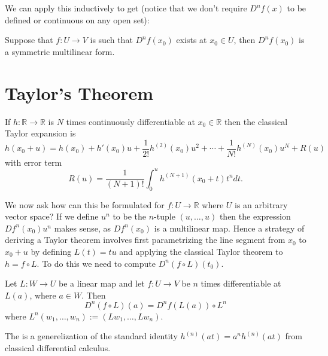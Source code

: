 \documentclass[twoside, a4paper, 10pt]{amsart}
\begin{document}
We can apply this inductively to get (notice that we don't require $D^nf(x)$ to be defined or continuous on any open set): 
\begin{thm} Suppose that $f:U \to V$ is such that $D^nf(x_0)$ exists at $x_0 \in U$, then $D^nf(x_0)$ is a symmetric multilinear form. \end{thm} 

\section{Taylor's Theorem}

If $h: \mathbb{R} \to \mathbb{R}$ is $N$ times continuously differentiable at $x_0 \in \mathbb{R}$ then the classical Taylor expansion is $$h(x_0 + u) = h(x_0) + h'(x_0)u + \frac{1}{2!}h^{(2)}(x_0)u^2 + \cdots + \frac{1}{N!}h^{(N)}(x_0)u^N + R(u)$$ with error term $$R(u) = \frac{1}{(N+1)!} \int_{0}^u h^{(N+1)}(x_0 + t) t^n dt.$$ 

We now ask how can this be formulated for $f:U \to \mathbb{R}$ where $U$ is an arbitrary vector space? If we define $u^n$ to be the $n$-tuple $(u, \ldots, u)$ then the expression $Df^n(x_0) u^n$ makes sense, as $Df^n(x_0)$ is a multilinear map. Hence a strategy of deriving a Taylor theorem involves first parametrizing the line segment from $x_0$ to $x_0 + u$ by defining $L(t) = tu$ and applying the classical Taylor theorem to $h = f \circ L$. To do this we need to compute $D^n(f \circ L) (t_0)$. 

\begin{lemma}\label{lemma: iterated linear chain rule}  Let $L: W \to U$ be a linear map and let $f:U \to V$ be $n$ times differentiable at $L(a)$, where $a \in W$. Then $$D^n(f \circ L)(a) = D^nf (L(a)) \circ  L^n$$ where $L^n(w_1, \ldots, w_n) := (Lw_1, \ldots, Lw_n)$. \end{lemma}

\begin{remark} The is a generelization of the standard identity $h^{(n)}(at) = a^n h^{(n)}(at)$ from classical differential calculus. \end{remark}
\end{document}
